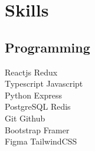 \begin{minipage}[t]{0.33\textwidth}




\section{Skills}
\subsection{Programming}
Reactjs \textbullet{}  Redux \\Typescript\textbullet{}  Javascript \\ Python \textbullet{} Express \\
PostgreSQL \textbullet{} Redis \\
Git \textbullet{} Github \\
Bootstrap \textbullet{} Framer \\ Figma \textbullet{} TailwindCSS
\sectionsep


\end{minipage}
